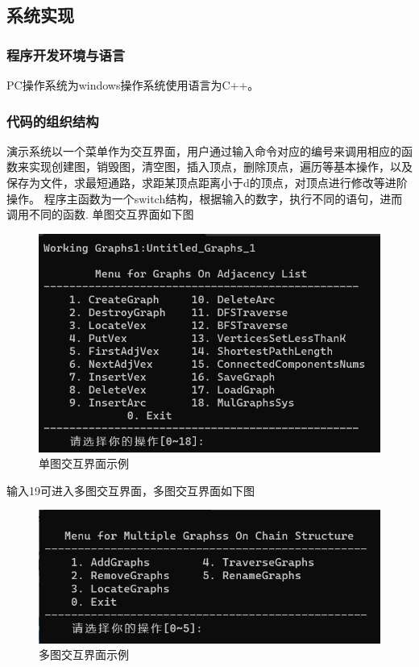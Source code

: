 \documentclass[supercite]{Experimental_Report}
\theoremstyle{definition}
\begin{document}
\newpage 
\subsection{系统实现}
\subsubsection{程序开发环境与语言}
PC操作系统为windows操作系统使用语言为C++。
\subsubsection{代码的组织结构}
演示系统以一个菜单作为交互界面，用户通过输入命令对应的编号来调用相应的函数来实现创建图，销毁图，清空图，插入顶点，删除顶点，遍历等基本操作，以及保存为文件，求最短通路，求距某顶点距离小于d的顶点，对顶点进行修改等进阶操作。
程序主函数为一个switch结构，根据输入的数字，执行不同的语句，进而调用不同的函数.
单图交互界面如下图
\begin{figure}[H] %
	\begin{center}
		\includegraphics[width=0.8\linewidth]{images/2.3.1.png}
		\caption{单图交互界面示例}
	\end{center}
\end{figure}
输入19可进入多图交互界面，多图交互界面如下图
\begin{figure}[H] %
	\begin{center}
		\includegraphics[width=0.8\linewidth]{images/2.3.8.png}
		\caption{多图交互界面示例}
	\end{center}
\end{figure}
\end{document}
